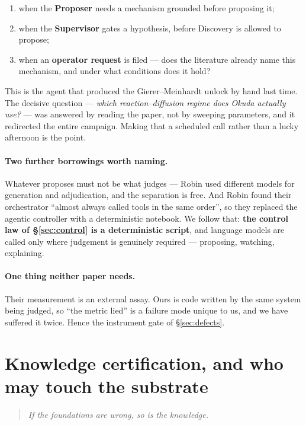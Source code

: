 \documentclass[11pt]{article}
\begin{document}
\begin{enumerate}\itemsep2pt
\item when the \textbf{Proposer} needs a mechanism grounded before proposing it;
\item when the \textbf{Supervisor} gates a hypothesis, before Discovery is allowed to propose;
\item when an \textbf{operator request} is filed --- does the literature already name this
mechanism, and under what conditions does it hold?
\end{enumerate}

This is the agent that produced the Gierer--Meinhardt unlock by hand last time. The decisive
question --- \emph{which reaction--diffusion regime does Okuda actually use?} --- was answered by
reading the paper, not by sweeping parameters, and it redirected the entire campaign. Making that
a scheduled call rather than a lucky afternoon is the point.

\paragraph{Two further borrowings worth naming.} Whatever proposes must not be what judges ---
Robin used different models for generation and adjudication, and the separation is free. And
Robin found their orchestrator ``almost always called tools in the same order'', so they replaced
the agentic controller with a deterministic notebook. We follow that: \textbf{the control law of
\S\ref{sec:control} is a deterministic script}, and language models are called only where
judgement is genuinely required --- proposing, watching, explaining.

\paragraph{One thing neither paper needs.} Their measurement is an external assay. Ours is code
written by the same system being judged, so ``the metric lied'' is a failure mode unique to us,
and we have suffered it twice. Hence the instrument gate of \S\ref{sec:defects}.

\section{Knowledge certification, and who may touch the substrate}
\label{sec:certify}

\begin{quote}
\emph{If the foundations are wrong, so is the knowledge.}
\end{quote}
\end{document}
